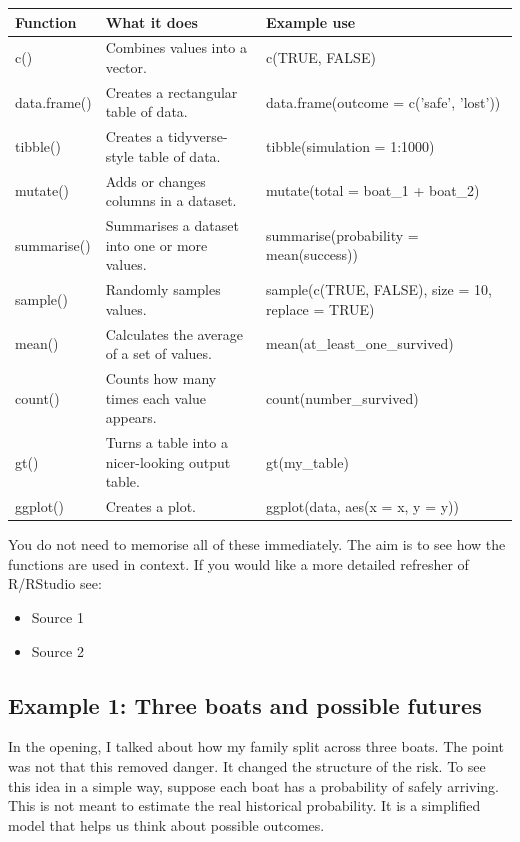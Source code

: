 \documentclass[
  letterpaper,
  DIV=11,
  numbers=noendperiod]{scrreprt}
\providecommand{\tightlist}{%
  \setlength{\itemsep}{0pt}\setlength{\parskip}{0pt}}
\begin{document}
\begin{table}
\fontsize{12.0pt}{14.0pt}\selectfont
\begin{tabular*}{\linewidth}{@{\extracolsep{\fill}}lll}
\toprule
Function & What it does & Example use \\ 
\midrule\addlinespace[2.5pt]
c() & Combines values into a vector. & c(TRUE, FALSE) \\ 
data.frame() & Creates a rectangular table of data. & data.frame(outcome = c('safe', 'lost')) \\ 
tibble() & Creates a tidyverse-style table of data. & tibble(simulation = 1:1000) \\ 
mutate() & Adds or changes columns in a dataset. & mutate(total = boat\_1 + boat\_2) \\ 
summarise() & Summarises a dataset into one or more values. & summarise(probability = mean(success)) \\ 
sample() & Randomly samples values. & sample(c(TRUE, FALSE), size = 10, replace = TRUE) \\ 
mean() & Calculates the average of a set of values. & mean(at\_least\_one\_survived) \\ 
count() & Counts how many times each value appears. & count(number\_survived) \\ 
gt() & Turns a table into a nicer-looking output table. & gt(my\_table) \\ 
ggplot() & Creates a plot. & ggplot(data, aes(x = x, y = y)) \\ 
\bottomrule
\end{tabular*}
\end{table}

You do not need to memorise all of these immediately. The aim is to see
how the functions are used in context. If you would like a more detailed
refresher of R/RStudio see:

\begin{itemize}
\tightlist
\item
  Source 1
\item
  Source 2
\end{itemize}

\subsection{Example 1: Three boats and possible
futures}\label{example-1-three-boats-and-possible-futures}

In the opening, I talked about how my family split across three boats.
The point was not that this removed danger. It changed the structure of
the risk. To see this idea in a simple way, suppose each boat has a
probability of safely arriving. This is not meant to estimate the real
historical probability. It is a simplified model that helps us think
about possible outcomes.
\end{document}
